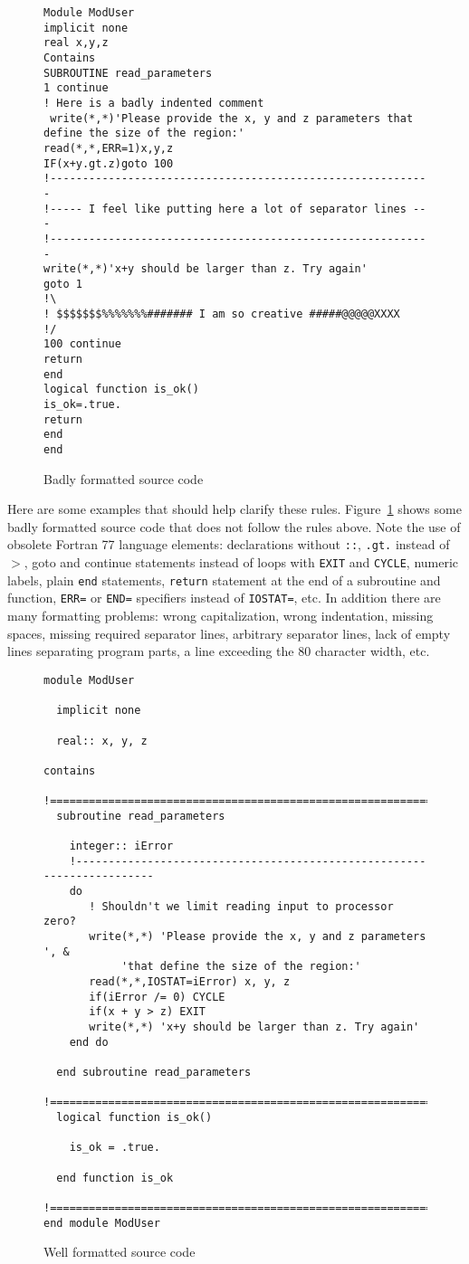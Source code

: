 \documentclass{article}
\begin{document}
\begin{figure}
\begin{verbatim}
Module ModUser
implicit none
real x,y,z
Contains
SUBROUTINE read_parameters 
1 continue
! Here is a badly indented comment
 write(*,*)'Please provide the x, y and z parameters that define the size of the region:'
read(*,*,ERR=1)x,y,z
IF(x+y.gt.z)goto 100
!-----------------------------------------------------------
!----- I feel like putting here a lot of separator lines ---
!-----------------------------------------------------------
write(*,*)'x+y should be larger than z. Try again'
goto 1
!\
! $$$$$$$%%%%%%%####### I am so creative #####@@@@@XXXX
!/
100 continue
return
end
logical function is_ok()
is_ok=.true.
return
end
end
\end{verbatim}
\caption{Badly formatted source code}
\label{fig:badformat}
\end{figure}

Here are some examples that should help clarify these rules. 
Figure~\ref{fig:badformat} shows some badly formatted source 
code that does not follow the rules above.
Note the use of obsolete Fortran 77 language elements:
declarations without {\tt ::}, {\tt .gt.} instead of $>$, 
{goto} and {continue} statements instead of loops with 
{\tt EXIT} and {\tt CYCLE}, 
numeric labels, plain {\tt end} statements, 
{\tt return} statement at the end of a subroutine and
function, {\tt ERR=} or {\tt END=} specifiers instead of {\tt IOSTAT=}, etc.
In addition there are many formatting problems:
wrong capitalization, wrong indentation, missing spaces, missing
required separator lines, arbitrary separator lines,
lack of empty lines separating program parts, a line
exceeding the 80 character width, etc.

\begin{figure}
\begin{verbatim}
module ModUser

  implicit none

  real:: x, y, z

contains
  !=========================================================================
  subroutine read_parameters 

    integer:: iError
    !-----------------------------------------------------------------------
    do
       ! Shouldn't we limit reading input to processor zero?
       write(*,*) 'Please provide the x, y and z parameters ', &
            'that define the size of the region:'
       read(*,*,IOSTAT=iError) x, y, z
       if(iError /= 0) CYCLE
       if(x + y > z) EXIT
       write(*,*) 'x+y should be larger than z. Try again'
    end do

  end subroutine read_parameters
  !=========================================================================
  logical function is_ok()

    is_ok = .true.

  end function is_ok
  !=========================================================================
end module ModUser
\end{verbatim}
\caption{Well formatted source code}
\label{fig:goodformat}
\end{figure}
\end{document}
